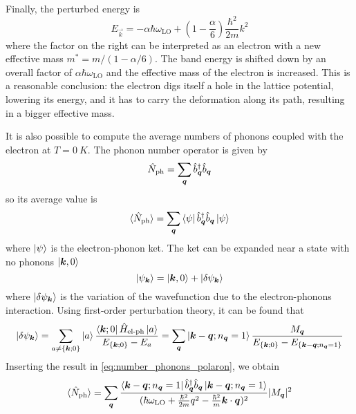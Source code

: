 Finally, the perturbed energy is
\begin{equation} \label{eq:perturbation_energy}
    E_\vec{k} = -\alpha \hbar \omega_\text{LO} + \left(1 - \frac{\alpha}{6}\right)\frac{\hbar^2}{2m}k^2
\end{equation}
where the factor on the right can be interpreted as an electron with a new effective mass $m^* = m / (1-\alpha/6)$. The band energy is shifted down by an overall factor of $\alpha \hbar \omega_\text{LO}$ and the effective mass of the electron is increased. This is a reasonable conclusion: the electron digs itself a hole in the lattice potential, lowering its energy, and it has to carry the deformation along its path, resulting in a bigger effective mass.

It is also possible to compute the average numbers of phonons coupled with the electron at $T = \SI{0}{K}$. The phonon number operator is given by
\begin{equation}
    \hat{N}_\text{ph} = \sum_{\mathbf{\boldsymbol{q}}} \hat{b}^\dagger_{\mathbf{\boldsymbol{q}}} \hat{b}_{\mathbf{\boldsymbol{q}}}
\end{equation}
so its average value is
\begin{equation} \label{eq:number_phonons_polaron}
    \langle \hat{N}_\text{ph} \rangle = \sum_{\mathbf{\boldsymbol{q}}} \bra{\psi} \hat{b}^\dagger_{\mathbf{\boldsymbol{q}}} \hat{b}_{\mathbf{\boldsymbol{q}}} \ket{\psi}
\end{equation}
where $\ket{\psi}$ is the electron-phonon ket. The ket can be expanded near a state with no phonons $\ket{\mathbf{\boldsymbol{k}}, 0}$
\begin{equation}
    \ket{\psi_{\mathbf{\boldsymbol{k}}}} = \ket{\mathbf{\boldsymbol{k}}, 0} + \ket{\delta\psi_{\mathbf{\boldsymbol{k}}}}
\end{equation}
where $\ket{\delta\psi_{\mathbf{\boldsymbol{k}}}}$ is the variation of the wavefunction due to the electron-phonons interaction. Using first-order perturbation theory, it can be found that
\begin{equation}
    \ket{\delta\psi_{\mathbf{\boldsymbol{k}}}} = \sum_{a \neq \{\mathbf{\boldsymbol{k}};0\}} \ket{a} \frac{\bra{\mathbf{\boldsymbol{k}};0} \hat{H}_\text{el-ph} \ket{a}}{E_{\{\mathbf{\boldsymbol{k}};0\}} - E_a}
    = \sum_{\mathbf{\boldsymbol{q}}} \ket{\mathbf{\boldsymbol{k}}-\mathbf{\boldsymbol{q}};n_{\mathbf{\boldsymbol{q}}}=1} \frac{M_{\mathbf{\boldsymbol{q}}}}{E_{\{\mathbf{\boldsymbol{k}};0\}} - E_{\{\mathbf{\boldsymbol{k}}-\mathbf{\boldsymbol{q}};n_{\mathbf{\boldsymbol{q}}}=1\}}}
\end{equation}
Inserting the result in \cref{eq:number_phonons_polaron}, we obtain
\begin{equation}
    \langle \hat{N}_\text{ph} \rangle = \sum_{\mathbf{\boldsymbol{q}}} \frac{\bra{\mathbf{\boldsymbol{k}}-\mathbf{\boldsymbol{q}};n_{\mathbf{\boldsymbol{q}}}=1} \hat{b}^\dagger_{\mathbf{\boldsymbol{q}}} \hat{b}_{\mathbf{\boldsymbol{q}}} \ket{\mathbf{\boldsymbol{k}}-\mathbf{\boldsymbol{q}};n_{\mathbf{\boldsymbol{q}}}=1}}{(\hbar\omega_\text{LO} + \frac{\hbar^2}{2m}q^2 - \frac{\hbar^2}{m}\mathbf{\boldsymbol{k}}\cdot\mathbf{\boldsymbol{q}})^2} |M_{\mathbf{\boldsymbol{q}}}|^2
\end{equation}
